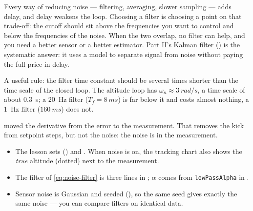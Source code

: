 \begin{keyidea}
Every way of reducing noise — filtering, averaging, slower sampling — adds delay, and delay weakens the loop. Choosing a filter is choosing a point on that trade-off: the cutoff should sit above the frequencies you want to control and below the frequencies of the noise. When the two overlap, no filter can help, and you need a better sensor or a better estimator. Part II's Kalman filter () is the systematic answer: it uses a model to separate signal from noise without paying the full price in delay.
\end{keyidea}

A useful rule: the filter time constant should be several times shorter than the time scale of the closed loop. The altitude loop has $\omega_n \approx \SI{3}{rad/s}$, a time scale of about \SI{0.3}{s}; a \SI{20}{Hz} filter ($T_f = \SI{8}{ms}$) is far below it and costs almost nothing, a \SI{1}{Hz} filter ($\SI{160}{ms}$) does not.

\begin{watchout}
 moved the derivative from the error to the measurement. That removes the kick from setpoint steps, but not the noise: the noise is in the measurement.
\end{watchout}


\begin{inapp}
\begin{itemize}[leftmargin=1.2em]
  \item The lesson sets  () and . When noise is on, the tracking chart also shows the \emph{true} altitude (dotted) next to the measurement.
  \item The filter of \cref{eq:noise-filter} is three lines in ; $\alpha$ comes from \texttt{lowPassAlpha} in .
  \item Sensor noise is Gaussian and seeded (), so the same seed gives exactly the same noise — you can compare filters on identical data.
\end{itemize}
\end{inapp}


